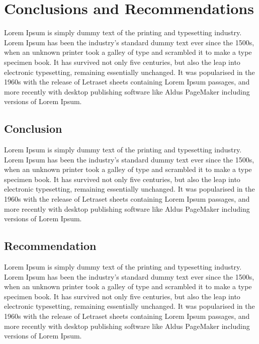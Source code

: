 \newpage
\section{Conclusions and Recommendations}
\label{Conclusions and Recommendations}
Lorem Ipsum is simply dummy text of the printing and typesetting industry. Lorem Ipsum has been the industry's standard dummy text ever since the 1500s, when an unknown printer took a galley of type and scrambled it to make a type specimen book. It has survived not only five centuries, but also the leap into electronic typesetting, remaining essentially unchanged. It was popularised in the 1960s with the release of Letraset sheets containing Lorem Ipsum passages, and more recently with desktop publishing software like Aldus PageMaker including versions of Lorem Ipsum.

\subsection{Conclusion}
Lorem Ipsum is simply dummy text of the printing and typesetting industry. Lorem Ipsum has been the industry's standard dummy text ever since the 1500s, when an unknown printer took a galley of type and scrambled it to make a type specimen book. It has survived not only five centuries, but also the leap into electronic typesetting, remaining essentially unchanged. It was popularised in the 1960s with the release of Letraset sheets containing Lorem Ipsum passages, and more recently with desktop publishing software like Aldus PageMaker including versions of Lorem Ipsum.

\subsection{Recommendation}
Lorem Ipsum is simply dummy text of the printing and typesetting industry. Lorem Ipsum has been the industry's standard dummy text ever since the 1500s, when an unknown printer took a galley of type and scrambled it to make a type specimen book. It has survived not only five centuries, but also the leap into electronic typesetting, remaining essentially unchanged. It was popularised in the 1960s with the release of Letraset sheets containing Lorem Ipsum passages, and more recently with desktop publishing software like Aldus PageMaker including versions of Lorem Ipsum.